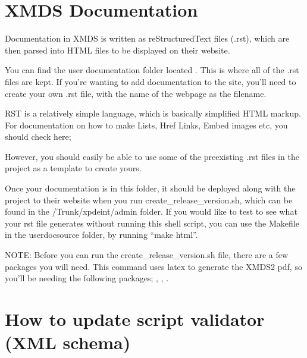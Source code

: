 \documentclass[letterpaper,10pt,english]{sphinxmanual}
\begin{document}
\section{XMDS Documentation}
\label{\detokenize{developer:xmds-documentation}}\label{\detokenize{developer:userdocumentation}}\label{\detokenize{developer:index-2}}
\sphinxAtStartPar
Documentation in XMDS is written as reStructuredText files (.rst), which are then parsed into HTML files to be displayed on their website.

\sphinxAtStartPar
You can find the user documentation folder located . This is where all of the .rst files are kept. If you’re wanting to add documentation to the site, you’ll need to create your own .rst file, with the name of the webpage as the filename.

\sphinxAtStartPar
RST is a relatively simple language, which is basically simplified HTML markup. For documentation on how to make Lists, Href Links, Embed images etc, you should check here;

\sphinxAtStartPar
{}

\sphinxAtStartPar
However, you should easily be able to use some of the pre\sphinxhyphen{}existing .rst files in the project as a template to create yours.

\sphinxAtStartPar
Once your documentation is in this folder, it should be deployed along with the project to their website when you run create\_release\_version.sh, which can be found in the /Trunk/xpdeint/admin folder. If you would like to test to see what your rst file generates without running this shell script, you can use the Makefile in the userdoc\sphinxhyphen{}source folder, by running “make html”.

\sphinxAtStartPar
NOTE: Before you can run the create\_release\_version.sh file, there are a few packages you will need. This command uses latex to generate the XMDS2 pdf, so you’ll be needing the following packages; , , .

\ignorespaces 

\section{How to update  script validator (XML schema)}
\label{\detokenize{developer:how-to-update-xmds2-script-validator-xml-schema}}\label{\detokenize{developer:howtoaddelementtovalidator}}\label{\detokenize{developer:index-3}}
\end{document}
